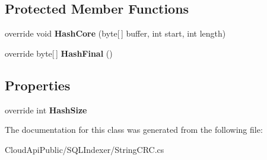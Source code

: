 \subsection*{Protected Member Functions}
\begin{DoxyCompactItemize}
\item 
\hypertarget{class_s_q_l_indexer_1_1_string_c_r_c_ac979bcf2d618f98e21fedfec781ef5ee}{override void {\bfseries Hash\-Core} (byte\mbox{[}$\,$\mbox{]} buffer, int start, int length)}\label{class_s_q_l_indexer_1_1_string_c_r_c_ac979bcf2d618f98e21fedfec781ef5ee}

\item 
\hypertarget{class_s_q_l_indexer_1_1_string_c_r_c_a8595cade9f90915e7ed51f62f8be1526}{override byte\mbox{[}$\,$\mbox{]} {\bfseries Hash\-Final} ()}\label{class_s_q_l_indexer_1_1_string_c_r_c_a8595cade9f90915e7ed51f62f8be1526}

\end{DoxyCompactItemize}
\subsection*{Properties}
\begin{DoxyCompactItemize}
\item 
\hypertarget{class_s_q_l_indexer_1_1_string_c_r_c_a5f5d7f51f60cd104c2546b485767fc90}{override int {\bfseries Hash\-Size}}\label{class_s_q_l_indexer_1_1_string_c_r_c_a5f5d7f51f60cd104c2546b485767fc90}

\end{DoxyCompactItemize}


The documentation for this class was generated from the following file\-:\begin{DoxyCompactItemize}
\item 
Cloud\-Api\-Public/\-S\-Q\-L\-Indexer/String\-C\-R\-C.\-cs\end{DoxyCompactItemize}
